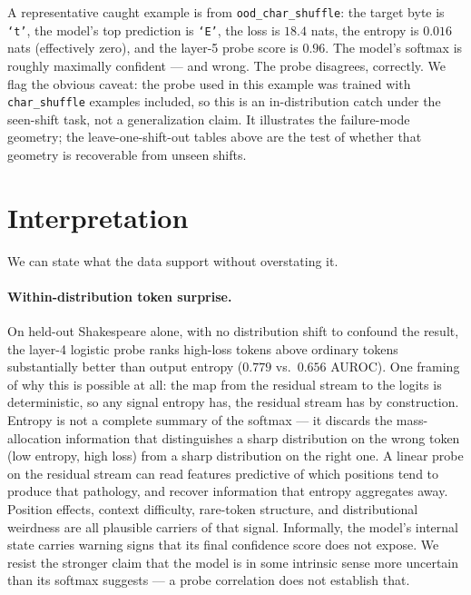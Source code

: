 \documentclass[11pt]{article}
\begin{document}
A representative caught example is from \texttt{ood\_char\_shuffle}: the target byte is \texttt{`t'}, the model's top prediction is \texttt{`E'}, the loss is $18.4$ nats, the entropy is $0.016$ nats (effectively zero), and the layer-5 probe score is $0.96$. The model's softmax is roughly maximally confident --- and wrong. The probe disagrees, correctly. We flag the obvious caveat: the probe used in this example was trained with \texttt{char\_shuffle} examples included, so this is an in-distribution catch under the seen-shift task, not a generalization claim. It illustrates the failure-mode geometry; the leave-one-shift-out tables above are the test of whether that geometry is recoverable from unseen shifts.

\section{Interpretation}

We can state what the data support without overstating it.

\paragraph{Within-distribution token surprise.}
On held-out Shakespeare alone, with no distribution shift to confound the result, the layer-4 logistic probe ranks high-loss tokens above ordinary tokens substantially better than output entropy ($0.779$ vs.\ $0.656$ AUROC). One framing of why this is possible at all: the map from the residual stream to the logits is deterministic, so any signal entropy has, the residual stream has by construction. Entropy is not a complete summary of the softmax --- it discards the mass-allocation information that distinguishes a sharp distribution on the wrong token (low entropy, high loss) from a sharp distribution on the right one. A linear probe on the residual stream can read features predictive of which positions tend to produce that pathology, and recover information that entropy aggregates away. Position effects, context difficulty, rare-token structure, and distributional weirdness are all plausible carriers of that signal. Informally, the model's internal state carries warning signs that its final confidence score does not expose. We resist the stronger claim that the model is in some intrinsic sense more uncertain than its softmax suggests --- a probe correlation does not establish that.
\end{document}

